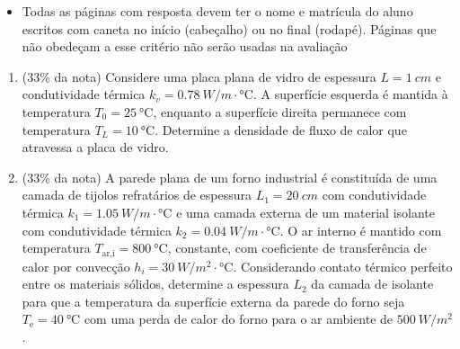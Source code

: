 \documentclass[12pt,a4paper,brazilian]{article}
\newcommand{\ratio}[1]{(#1\% da nota)}
\begin{document}
\begin{tcolorbox}[colback=black!10, colframe=black!50, title=Observações]
    \begin{itemize}
        \item Todas as páginas com resposta devem ter o nome e matrícula do
            aluno escritos com caneta no início (cabeçalho) ou no final
            (rodapé). Páginas que não obedeçam a esse critério não serão usadas
            na avaliação
    \end{itemize}
\end{tcolorbox}

\vspace{2em}

\begin{enumerate}
    \item \ratio{33} Considere uma placa plana de vidro de espessura \(L=\SI{1}{cm}\) e
        condutividade térmica \(k_v = \SI{0.78}{W/m\cdot\celsius}\). A superfície
        esquerda é mantida à temperatura \(T_0 = \SI{25}{\celsius}\), enquanto 
        a superfície direita permanece com temperatura \(T_L = \SI{10}{\celsius}\).
        Determine a densidade de fluxo de calor que atravessa a placa de vidro.

    \item \ratio{33} A parede plana de um forno industrial é constituída de uma camada
        de tijolos refratários de espessura \(L_1 = \SI{20}{cm}\) com condutividade 
        térmica \(k_1 = \SI{1.05}{W/m\cdot\celsius}\) e uma camada externa de um material 
        isolante com condutividade térmica \(k_2 = \SI{0.04}{W/m\cdot\celsius}\). O ar interno 
        é mantido com temperatura \(T_\text{ar,i} = \SI{800}{\celsius}\), constante,
        com coeficiente de transferência de calor por convecção \(h_i = \SI{30}{W/{m^2}\cdot\celsius}\).
        Considerando contato térmico perfeito entre os materiais sólidos, determine a 
        espessura \(L_2\) da camada de isolante para que a temperatura da superfície
        externa da parede do forno seja \(T_\text{e}= \SI{40}{\celsius}\) com uma perda
        de calor do forno para o ar ambiente de \(\SI{500}{W/m^2}\).


\end{enumerate}
\end{document}
